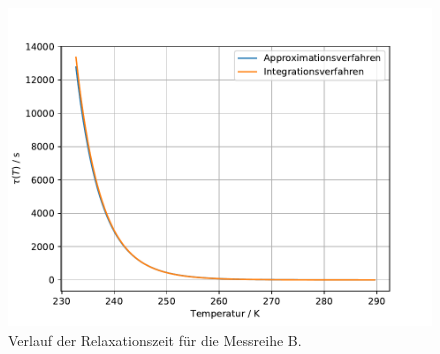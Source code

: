 \begin{figure}
    \centering
    \includegraphics[width = \textwidth , keepaspectratio]{figure/tau_verlauf_B.pdf}
    \caption{Verlauf der Relaxationszeit für die Messreihe B.}
    \label{fig:tau_verlauf_B}
\end{figure}